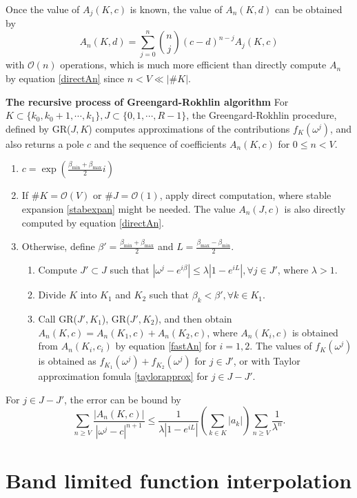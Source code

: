 \documentclass[conference,9pt]{IEEEtran}
\theoremstyle{definition}
\begin{document}
Once the value of $A_j(K,c)$ is known, the value of $A_n(K,d)$ can be obtained by
\begin{equation}
    \label{fastAn}
    A_n(K,d)=\sum_{j=0}^n\binom{n}{j}(c-d)^{n-j}A_j(K,c)
\end{equation}
with $\mathcal{O}(n)$ operations, which is much more efficient than directly compute $A_n$ by equation \ref{directAn} since $n<V\ll |\# K|$.

{\bf The recursive process of Greengard-Rokhlin algorithm} For $K\subset \{k_0,k_0+1,\cdots,k_1\}, J\subset\{0,1,\cdots,R-1\}$, the Greengard-Rokhlin procedure, defined by GR($J,K$) computes approximations of the contributions $f_K(\omega^j)$, and also returns a pole $c$ and the sequence of coefficients $A_n(K,c)$ for $0\leq n<V$.
\begin{enumerate}
    \item $c=\exp(\frac{\beta_{\min}+\beta_{\max}}{2}i)$
    \item If $\# K=\mathcal{O}(V)$ or $\# J=\mathcal{O}(1)$, apply direct computation, where stable expansion \ref{stabexpan} might be needed. The value $A_n(J,c)$ is also directly computed by equation \ref{directAn}.
    \item Otherwise, define $\beta'=\frac{\beta_{\min}+\beta_{\max}}{2}$ and $L=\frac{\beta_{\max}-\beta_{\min}}{2}$.
    \begin{enumerate}
        \item Compute $J'\subset J$ such that $|\omega^j-e^{i\beta}|\leq \lambda|1-e^{iL}|,\forall j\in J'$, where $\lambda>1$. 
        \item Divide $K$ into $K_1$ and $K_2$ such that $\beta_k<\beta',\forall k\in K_1$.
        \item Call GR($J',K_1$), GR($J',K_2$), and then obtain $A_n(K,c)=A_n(K_1,c)+A_n(K_2,c)$, where $A_n(K_i,c)$ is obtained from $A_n(K_i,c_i)$ by equation \ref{fastAn} for $i=1,2$. The values of $f_K(\omega^j)$ is obtained as $f_{K_1}(\omega^j)+f_{K_2}(\omega^j)$ for $j\in J'$, or with Taylor approximation fomula \ref{taylorapprox} for $j\in J-J'$.
    \end{enumerate}
\end{enumerate}

For $j\in J-J'$, the error can be bound by 
\begin{equation*}
    \sum_{n\geq V}\frac{|A_n(K,c)|}{|\omega^j-c|^{n+1}}\leq \frac{1}{\lambda|1-e^{iL}|}\left(\sum_{k\in K}|a_k|\right)\sum_{n\geq V}\frac{1}{\lambda^n}.
\end{equation*}
\section{Band limited function interpolation}
\end{document}
